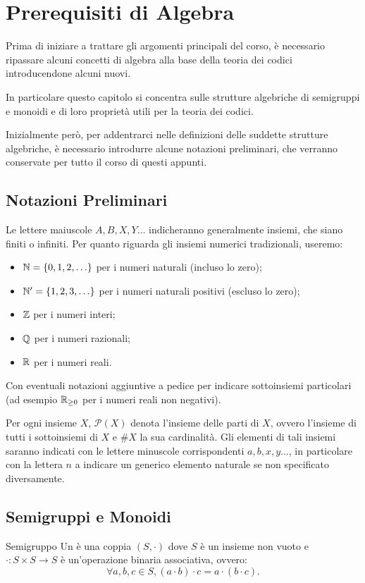 \chapter{Prerequisiti di Algebra}

Prima di iniziare a trattare gli argomenti principali del corso,
è necessario ripassare alcuni concetti di algebra alla base della teoria dei codici introducendone alcuni nuovi.

In particolare questo capitolo si concentra sulle strutture algebriche di semigruppi e monoidi e di loro proprietà utili per la teoria dei codici.

Inizialmente però, per addentrarci nelle definizioni delle suddette strutture algebriche, è necessario introdurre alcune notazioni preliminari, che verranno conservate per tutto il corso di questi appunti.

\section{Notazioni Preliminari}

Le lettere maiuscole \(A, B, X, Y \ldots\) indicheranno generalmente insiemi, che siano finiti o infiniti.
Per quanto riguarda gli insiemi numerici tradizionali, useremo:
\begin{itemize}
  \item \(\N = \set{0,1,2,\ldots}\) per i numeri naturali (incluso lo zero);
  \item \(\N' = \set{1,2,3,\ldots}\) per i numeri naturali positivi (escluso lo zero);
  \item \(\mathbb{Z}\) per i numeri interi;
  \item \(\mathbb{Q}\) per i numeri razionali;
  \item \(\mathbb{R}\) per i numeri reali.
\end{itemize}
Con eventuali notazioni aggiuntive a pedice per indicare sottoinsiemi particolari (ad esempio \(\mathbb{R}_{\geq 0}\) per i numeri reali non negativi).

Per ogni insieme \(X\), \(\mathcal{P}(X)\) denota l'insieme delle parti di \(X\), ovvero l'insieme di tutti i sottoinsiemi di \(X\) e \(\#X\) la sua cardinalità.
Gli elementi di tali insiemi saranno indicati con le lettere minuscole corrispondenti \(a,b,x,y \ldots\), in particolare con la lettera \(n\) a indicare un generico elemento naturale se non specificato diversamente.

\section{Semigruppi e Monoidi}
\begin{definition}{Semigruppo}
  Un  è una coppia \((S, \cdot)\) dove \(S\) è un insieme non vuoto e \(\cdot : S \times S \to S\) è un'operazione binaria associativa, ovvero:
  \[\forall a,b,c \in S, (a \cdot b) \cdot c = a \cdot (b \cdot c).\]
\end{definition}

